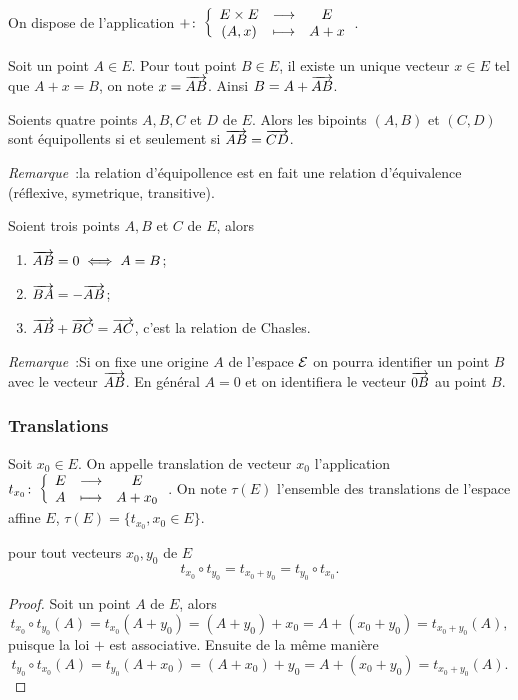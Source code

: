 On dispose de l'application \(+\colon \left\{\begin{array}{ccc} E\times E & \longrightarrow &E\\ (A,x) & \longmapsto & A+x \end{array} \right.\).

\begin{defdef}
  Soit un point \(A \in E\). Pour tout point \(B \in E\), il existe un unique vecteur \(x \in E\) tel que \(A+x=B\), on note \(x=\overrightarrow{AB}\). Ainsi \(B=A+\overrightarrow{AB}\).
\end{defdef}
\begin{defdef}
  Soients quatre points \(A,B,C\) et \(D\) de \(E\). Alors les bipoints \((A,B)\) et \((C,D)\) sont équipollents si et seulement si \(\overrightarrow{AB}=\overrightarrow{CD}\).
\end{defdef}

\emph{Remarque}~:la relation d'équipollence est en fait une relation d'équivalence (réflexive, symetrique, transitive).

\begin{prop}
  Soient trois points \(A,B\) et \(C\) de \(E\), alors
  \begin{enumerate}
    \item \(\overrightarrow{AB}=0 \iff A=B\);
    \item \(\overrightarrow{BA}=-\overrightarrow{AB}\);
    \item \(\overrightarrow{AB}+\overrightarrow{BC}=\overrightarrow{AC}\), c'est la relation de Chasles.
  \end{enumerate}
\end{prop}

\emph{Remarque}~:Si on fixe une origine \(A\) de l'espace \(\mathcal{E}\) on pourra identifier un point \(B\) avec le vecteur \(\overrightarrow{AB}\). En général \(A=0\) et on identifiera le vecteur \(\overrightarrow{0B}\) au point \(B\).

\subsubsection{Translations}

\begin{defdef}
  Soit \(x_0 \in E\). On appelle translation de vecteur \(x_0\) l'application \(t_{x_0}\colon \left\{\begin{array}{ccc} E & \longrightarrow &E\\ A & \longmapsto & A+x_0 \end{array} \right.\). On note \(\tau(E)\) l'ensemble des translations de l'espace affine \(E\), \(\tau(E)=\{t_{x_0}, x_0 \in E\}\).
\end{defdef}

\begin{prop}\label{prop:associativitevec}
  pour tout vecteurs \(x_0, y_0\) de \(E\)
  \begin{equation}
    t_{x_0} \circ t_{y_0} = t_{x_0 +y_0} = t_{y_0} \circ t_{x_0}.
  \end{equation}
\end{prop}
\begin{proof}
  Soit un point \(A\) de \(E\), alors
  \begin{equation}
    t_{x_0} \circ t_{y_0} (A)=t_{x_0}(A+y_0) = (A+y_0)+x_0 = A+(x_0+y_0) =t_{x_0+y_0}(A),
  \end{equation}
  puisque la loi \(+\) est associative. Ensuite de la même manière
  \begin{equation}
    t_{y_0} \circ t_{x_0} (A)=t_{y_0}(A+x_0) = (A+x_0)+y_0 = A+(x_0+y_0)=t_{x_0+y_0}(A).
  \end{equation}
\end{proof}


